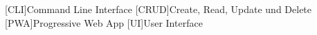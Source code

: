 \begin{acronym}[MMMMMM]
 
	[CLI]{Command Line Interface}
	[CRUD]{Create, Read, Update und Delete}
	[PWA]{Progressive Web App}
	[UI]{User Interface}
	
	
\end{acronym}
